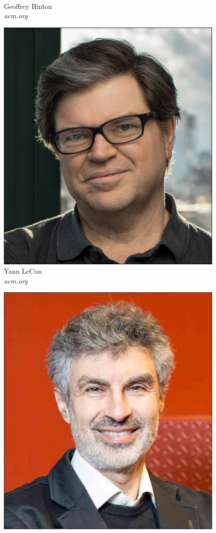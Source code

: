 \begin{frame}[t,fragile]
{{\begin{minipage}[t]{\textwidth}
\begin{minipage}[b]{0.33\textwidth}
\begin{figure}[ht]
					{\tiny\\Geoffrey Hinton\\\vspace*{-4pt}\textit{\textcopyright acm.org}}
				\end{figure}
			\end{minipage}
			\begin{minipage}[b]{0.33\textwidth}
				\centering
				\begin{figure}[ht]
					\includegraphics[width=.6\textwidth]{img/Yann-LeCun.jpeg}
					{\tiny\\Yann LeCun\\\vspace*{-4pt}\textit{\textcopyright acm.org}}
				\end{figure}
			\end{minipage}
			\begin{minipage}[b]{0.33\textwidth}
				\centering
				\begin{figure}[ht]
					\includegraphics[width=.6\textwidth]{img/Yoshua-Bengio.jpeg}

\end{figure}
\end{minipage}
\end{minipage}}}
\end{frame}
